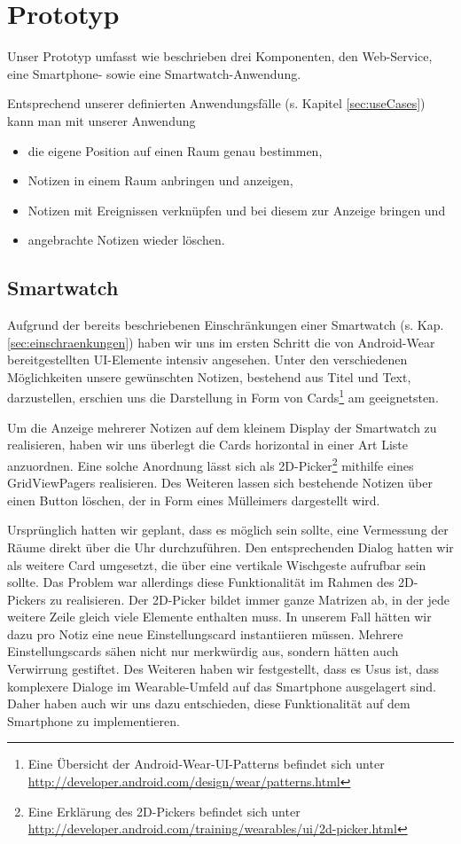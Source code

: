 \section{Prototyp}
\label{sec:prototyp}
Unser Prototyp umfasst wie beschrieben drei Komponenten, den Web-Service, eine Smartphone- sowie eine Smartwatch-Anwendung. 

Entsprechend unserer definierten Anwendungsfälle (s. Kapitel \ref{sec:useCases}) kann man mit unserer Anwendung
\begin{itemize}
\item{die eigene Position auf einen Raum genau bestimmen,}
\item{Notizen in einem Raum anbringen und anzeigen,}
\item{Notizen mit Ereignissen verknüpfen und bei diesem zur Anzeige bringen und}
\item{angebrachte Notizen wieder löschen.} 
\end{itemize}


\subsection{Smartwatch}
Aufgrund der bereits beschriebenen Einschränkungen einer Smartwatch (s. Kap. \ref{sec:einschraenkungen}) haben wir uns im ersten Schritt die von Android-Wear bereitgestellten UI-Elemente intensiv angesehen. Unter den verschiedenen Möglichkeiten unsere gewünschten Notizen, bestehend aus Titel und Text, darzustellen, erschien uns die Darstellung in Form von Cards\footnote{Eine Übersicht der Android-Wear-UI-Patterns befindet sich unter \url{http://developer.android.com/design/wear/patterns.html}} am geeignetsten.

Um die Anzeige mehrerer Notizen auf dem kleinem Display der Smartwatch zu realisieren, haben wir uns überlegt die Cards horizontal in einer Art Liste anzuordnen. Eine solche Anordnung lässt sich als 2D-Picker\footnote{Eine Erklärung des 2D-Pickers befindet sich unter  \url{http://developer.android.com/training/wearables/ui/2d-picker.html}} mithilfe eines GridViewPagers realisieren. Des Weiteren lassen sich bestehende Notizen über einen Button löschen, der in Form eines Mülleimers dargestellt wird. 

Ursprünglich hatten wir geplant, dass es möglich sein sollte, eine Vermessung der Räume direkt über die Uhr durchzuführen. Den entsprechenden Dialog hatten wir als weitere Card umgesetzt, die über eine vertikale Wischgeste aufrufbar sein sollte. Das Problem war allerdings diese Funktionalität im Rahmen des 2D-Pickers
zu realisieren. Der 2D-Picker bildet immer ganze Matrizen ab, in der jede weitere Zeile gleich viele Elemente enthalten muss. In unserem Fall hätten wir dazu pro Notiz eine neue Einstellungscard instantiieren müssen. Mehrere Einstellungscards sähen nicht nur merkwürdig aus, sondern hätten auch Verwirrung gestiftet. Des Weiteren haben wir festgestellt, dass es Usus ist, dass komplexere Dialoge im Wearable-Umfeld auf das Smartphone ausgelagert sind. Daher haben auch wir uns dazu entschieden, diese Funktionalität auf dem Smartphone zu implementieren.


